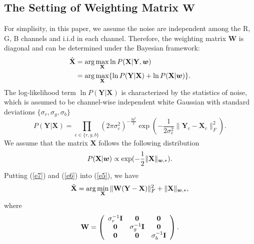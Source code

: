 \documentclass[10pt,twocolumn,letterpaper,sort&compress]{article}
\begin{document}
\subsection{The Setting of Weighting Matrix $\mathbf{W}$}
For simplisity, in this paper, we assume the noise are independent among the R, G, B channels and i.i.d in each channel. Therefore, the weighting matrix $\mathbf{W}$ is diagonal and can be determined under the Bayesian framework:
\vspace{-3mm}
\begin{equation}
\label{e5}
\vspace{-3mm}
\begin{split}
\hat{\mathbf{X}} 
&=
\arg\max_{\mathbf{X}}\ln P(\mathbf{X}|\mathbf{Y},\bm{w})
\\
&
=
\arg\max_{\mathbf{X}}\{\ln P(\mathbf{Y}|\mathbf{X})+\ln P(\mathbf{X}|\bm{w})\}.
\end{split}
\end{equation}
The log-likelihood term $\ln P(\mathbf{Y}|\mathbf{X})$ is characterized by the
statistics of noise, which is assumed to be channel-wise independent white Gaussian with standard deviations $\{\sigma_{r}, \sigma_{g}, \sigma_{b}\}$
\vspace{-4mm}
\begin{equation}
\label{e6}
P(\mathbf{Y}|\mathbf{X}) 
= 
\prod_{c\in\{r, g, b\}}
(2\pi\sigma_{c}^{2})^{-\frac{3p^{2}}{2}}
\exp(-\frac{1}{2\sigma_{c}^{2}}\|\mathbf{Y}_{c}-\mathbf{X}_{c}\|_{F}^{2}).
\end{equation}
We assume that the matrix $\mathbf{X}$ follows the following distribution
\vspace{-2mm}
\begin{equation}
\label{e7}
\vspace{-2mm}
P(\mathbf{X}|\bm{w})
\propto
\exp(-\frac{1}{2}\|\mathbf{X}\|_{\bm{w},*}).
\end{equation}
Putting (\ref{e7}) and (\ref{e6}) into (\ref{e5}), we have
\vspace{-2mm}
\begin{equation}
\vspace{-2mm}
\hat{\mathbf{X}}=\arg\min_{\mathbf{X}}\|\mathbf{W}(\mathbf{Y}-\mathbf{X})\|_{F}^{2}+\|\mathbf{X}\|_{\bm{w},*},
\end{equation}
where
\begin{equation}
\label{e9}
\vspace{-2mm}
\mathbf{W}
=
\left( \begin{array}{ccc}
\sigma_{r}^{-1}\mathbf{I} & \mathbf{0} & \mathbf{0}
\\
\mathbf{0} & \sigma_{g}^{-1}\mathbf{I} & \mathbf{0}
\\
\mathbf{0} & \mathbf{0} & \sigma_{b}^{-1}\mathbf{I}
\end{array} \right).
\end{equation}
\end{document}
